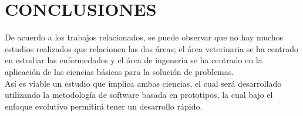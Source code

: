 \documentclass[letterpaper, 10 pt, conference]{ieeeconf}  %
\begin{document}
\section{CONCLUSIONES}

De acuerdo a los trabajos relacionados, se puede observar que no hay muchos estudios realizados que relacionen las dos \'areas; el \'area veterinaria se ha centrado en estudiar las enfermedades y el \'area de ingener\'ia se ha centrado en la aplicaci\'on de las ciencias b\'asicas para la soluci\'on de problemas.\\

As\'i es viable un estudio que implica ambas ciencias, el cual ser\'a desarrollado utilizando la metodolog\'ia de software basada en prototipos, la cual bajo el enfoque evolutivo permitir\'a tener un desarrollo r\'apido.

\addtolength{\textheight}{-12cm}   %













\end{document}
